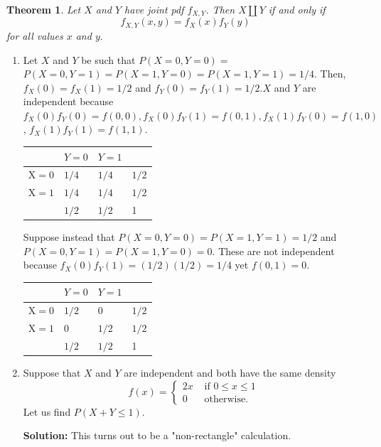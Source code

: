 \documentclass[13pt]{article}
\newtheorem{theorem}{Theorem}[section]
\theoremstyle{definition}
\newenvironment{solution}
{\color{C2}\begin{framed}\begingroup\textbf{Solution:} }
  {\endgroup\end{framed}}
\theoremstyle{remark}
\newenvironment{remark}
  {\pushQED{\qed}\renewcommand{\qedsymbol}{$\triangle$}\remarkx}
  {\popQED\endremarkx}
\begin{document}
\begin{theorem} Let $X$ and $Y$ have joint pdf $f_{X, Y}$. Then $X \amalg Y$ if and only if 
\[
f_{X, Y}(x, y)=f_{X}(x) f_{Y}(y)
\]for all values $x$ and $y.$
\end{theorem}
\begin{remark}\hfill
    \begin{enumerate}
        \item Let $X$ and $Y$ be such that $P(X=0, Y=0)=$ $P(X=0, Y=1)=P(X=1, Y=0)=P(X=1, Y=1)=1 / 4$. Then, $f_{X}(0)=f_{X}(1)=1 / 2$ and $f_{Y}(0)=f_{Y}(1)=1 / 2 . X$ and $Y$ are independent because $f_{X}(0) f_{Y}(0)=f(0,0), f_{X}(0) f_{Y}(1)=f(0,1), f_{X}(1) f_{Y}(0)=f(1,0)$, $f_{X}(1) f_{Y}(1)=f(1,1)$.

\begin{center}
\begin{tabular}{l|ll|l}
 & $Y=0$ & $Y=1$ &  \\
\hline
$\mathrm{X}=0$ & $1 / 4$ & $1 / 4$ & $1 / 2$ \\
$\mathrm{X}=1$ & $1 / 4$ & $1 / 4$ & $1 / 2$ \\
\hline
 & $1 / 2$ & $1 / 2$ & 1 \\
\hline
\end{tabular}
\end{center}

Suppose instead that $P(X=0, Y=0)=P(X=1, Y=1)=1 / 2$ and $P(X=0, Y=1)=P(X=1, Y=0)=0$. These are not independent because $f_{X}(0) f_{Y}(1)=(1 / 2)(1 / 2)=1 / 4$ yet $f(0,1)=0$.

\begin{center}
\begin{tabular}{l|ll|l}
 & $Y=0$ & $Y=1$ &  \\
\hline
$\mathrm{X}=0$ & $1 / 2$ & 0 & $1 / 2$ \\
$\mathrm{X}=1$ & 0 & $1 / 2$ & $1 / 2$ \\
\hline
 & $1 / 2$ & $1 / 2$ & 1 \\
\hline
\end{tabular}
\end{center}
\item Suppose that $X$ and $Y$ are independent and both have the same density
$$
f(x)= \begin{cases}2 x & \text { if } 0 \leq x \leq 1 \\ 0 & \text { otherwise. }\end{cases}
$$
Let us find $P(X+Y \leq 1)$.
\begin{solution}
    This turns out to be a "non-rectangle" calculation. 
    

\end{solution}
\end{enumerate}
\end{remark}
\end{document}
